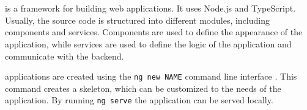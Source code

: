 \section{\angular{}}\label{sec:FE_angular}

\angular{} is a framework for building web applications.
It uses Node.js and TypeScript.
Usually, the source code is structured into different modules, including components and services.
Components are used to define the appearance of the application, while
services are used to define the logic of the application and communicate with the backend.

\angular{} applications are created using the \texttt{ng new NAME} command line interface \cite{angular_book2018}.
This command creates a skeleton, which can be customized to the needs of the application.
By running \texttt{ng serve} the application can be served locally.